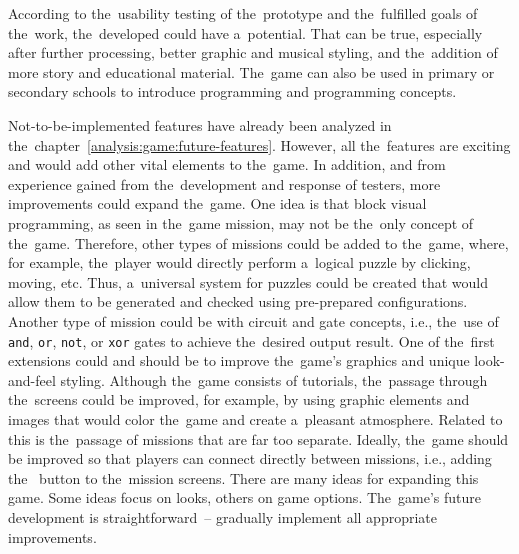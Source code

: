 \begin{conclusion}
\pagebreak
According to the~usability testing of the~prototype and the~fulfilled goals of the~work, the~developed could have a~potential.
That can be true, especially after further processing, better graphic and musical styling, and the~addition of more story and educational material.
The~game can also be used in primary or secondary schools to introduce programming and programming concepts.

Not-to-be-implemented features have already been analyzed in the~chapter~\ref{analysis:game:future-features}.
However, all the~features are exciting and would add other vital elements to the~game.
In addition, and from experience gained from the~development and response of testers, more improvements could expand the~game.
One idea is that block visual programming, as seen in the~game mission, may not be the~only concept of the~game.
Therefore, other types of missions could be added to the~game, where, for example, the~player would directly perform a~logical puzzle by clicking, moving, etc.
Thus, a~universal system for puzzles could be created that would allow them to be generated and checked using pre-prepared configurations.
Another type of mission could be with circuit and gate concepts, i.e., the~use of \texttt{and}, \texttt{or}, \texttt{not}, or \texttt{xor} gates to achieve the~desired output result.
One of the~first extensions could and should be to improve the~game's graphics and unique look-and-feel styling.
Although the~game consists of tutorials, the~passage through the~screens could be improved, for example, by using graphic elements and images that would color the~game and create a~pleasant atmosphere.
Related to this is the~passage of missions that are far too separate.
Ideally, the~game should be improved so that players can connect directly between missions, i.e., adding the~ button to the~mission screens.
There are many ideas for expanding this game.
Some ideas focus on looks, others on game options.
The~game's future development is straightforward~-- gradually implement all appropriate improvements.

\end{conclusion}
